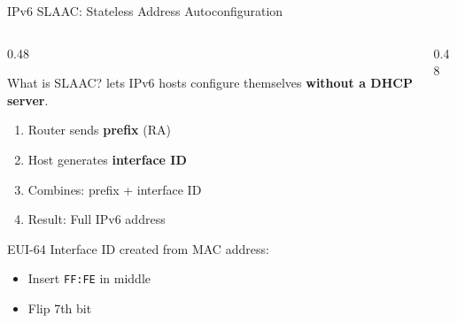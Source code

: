 \documentclass[aspectratio=169]{beamer}  %
\begin{document}
\begin{frame}{IPv6 SLAAC: Stateless Address Autoconfiguration}
    \begin{columns}[T]
        \begin{column}{0.48\textwidth}
            \begin{block}{What is SLAAC?}
                \small
                 lets IPv6 hosts configure themselves \textbf{without a DHCP server}.
                
                \vspace{0.2em}
                \begin{enumerate}\setlength{\itemsep}{1pt}
                    \item Router sends \textbf{prefix} (RA)
                    \item Host generates \textbf{interface ID}
                    \item Combines: prefix + interface ID
                    \item Result: Full IPv6 address
                \end{enumerate}
            \end{block}
            
            \vspace{0.2em}
            \begin{block}{EUI-64}
                \small
                Interface ID created from MAC address:
                \begin{itemize}\setlength{\itemsep}{1pt}
                    \item Insert \texttt{FF:FE} in middle
                    \item Flip 7th bit
                \end{itemize}
            \end{block}
        \end{column}
        \begin{column}{0.48\textwidth}
            \begin{center}
\end{center}
\end{column}
\end{columns}
\end{frame}
\end{document}
